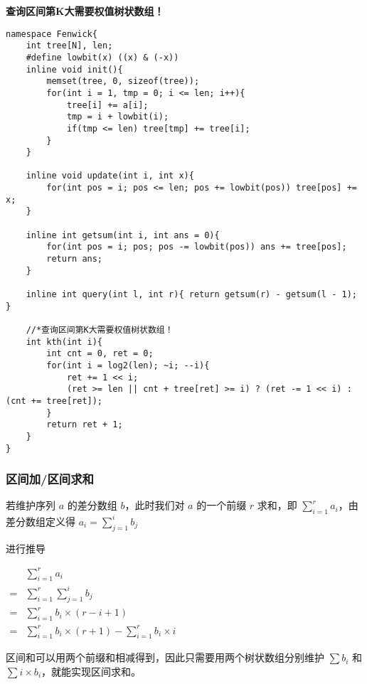 \documentclass[]{article}
\begin{document}
\textbf{查询区间第K大需要权值树状数组！}

\begin{verbatim}
namespace Fenwick{
    int tree[N], len;
    #define lowbit(x) ((x) & (-x))
    inline void init(){
        memset(tree, 0, sizeof(tree));
        for(int i = 1, tmp = 0; i <= len; i++){
            tree[i] += a[i];
            tmp = i + lowbit(i);
            if(tmp <= len) tree[tmp] += tree[i];
        }
    }

    inline void update(int i, int x){
        for(int pos = i; pos <= len; pos += lowbit(pos)) tree[pos] += x;
    }

    inline int getsum(int i, int ans = 0){
        for(int pos = i; pos; pos -= lowbit(pos)) ans += tree[pos];
        return ans;
    }

    inline int query(int l, int r){ return getsum(r) - getsum(l - 1); }

    //*查询区间第K大需要权值树状数组！
    int kth(int i){
        int cnt = 0, ret = 0;
        for(int i = log2(len); ~i; --i){
            ret += 1 << i;
            (ret >= len || cnt + tree[ret] >= i) ? (ret -= 1 << i) : (cnt += tree[ret]);
        }
        return ret + 1;
    }
}
\end{verbatim}

\hypertarget{ux533aux95f4ux52a0ux533aux95f4ux6c42ux548c}{%
\subsubsection{区间加/区间求和}\label{ux533aux95f4ux52a0ux533aux95f4ux6c42ux548c}}

若维护序列 \(a\) 的差分数组 \(b\)，此时我们对 \(a\) 的一个前缀 \(r\)
求和，即 \(\sum_{i=1}^{r} a_i\)，由差分数组定义得
\(a_i=\sum_{j=1}^i b_j\)

进行推导

\(\begin{aligned} &\sum_{i=1}^{r} a_i\\=&\sum_{i=1}^r\sum_{j=1}^i b_j\\=&\sum_{i=1}^r b_i\times(r-i+1) \\=&\sum_{i=1}^r b_i\times (r+1)-\sum_{i=1}^r b_i\times i \end{aligned}\)

区间和可以用两个前缀和相减得到，因此只需要用两个树状数组分别维护
\(\sum b_i\) 和 \(\sum i \times b_i\)，就能实现区间求和。
\end{document}
